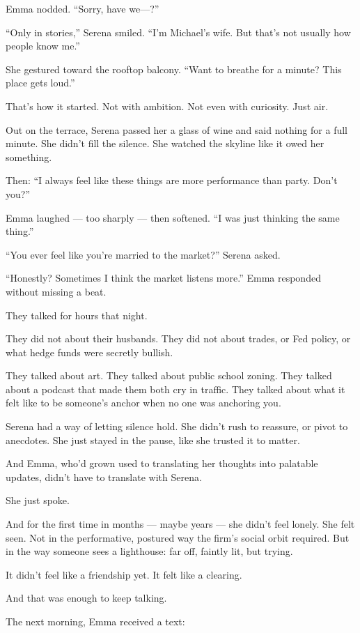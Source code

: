 Emma nodded. ``Sorry, have we—?''

``Only in stories,'' Serena smiled. ``I’m Michael’s wife. But that’s not usually how people know me.''

She gestured toward the rooftop balcony. ``Want to breathe for a minute? This place gets loud.''

That’s how it started. Not with ambition. Not even with curiosity. Just air.

Out on the terrace, Serena passed her a glass of wine and said nothing for a full minute. She didn’t 
fill the silence. She watched the skyline like it owed her something.

Then:  
``I always feel like these things are more performance than party. Don’t you?''

Emma laughed --- too sharply --- then softened. ``I was just thinking the same thing.''

``You ever feel like you’re married to the market?'' Serena asked.

``Honestly? Sometimes I think the market listens more.'' Emma responded without missing a beat.

They talked for hours that night.

They did not about their husbands.
They did not about trades, or Fed policy, or what hedge funds were secretly bullish.

They talked about art. They talked about public school zoning. They talked about a podcast that 
made them both cry in traffic. They talked about what it felt like to be someone’s anchor when 
no one was anchoring you.

Serena had a way of letting silence hold. She didn’t rush to reassure, or pivot to anecdotes. 
She just stayed in the pause, like she trusted it to matter.

And Emma, who’d grown used to translating her thoughts into palatable updates, didn’t have 
to translate with Serena.

She just spoke.

And for the first time in months --- maybe years --- she didn’t feel lonely.
She felt seen. Not in the performative, postured way the firm’s social orbit required.
But in the way someone sees a lighthouse: far off, faintly lit, but trying.

It didn’t feel like a friendship yet.
It felt like a clearing.

And that was enough to keep talking.

The next morning, Emma received a text:


